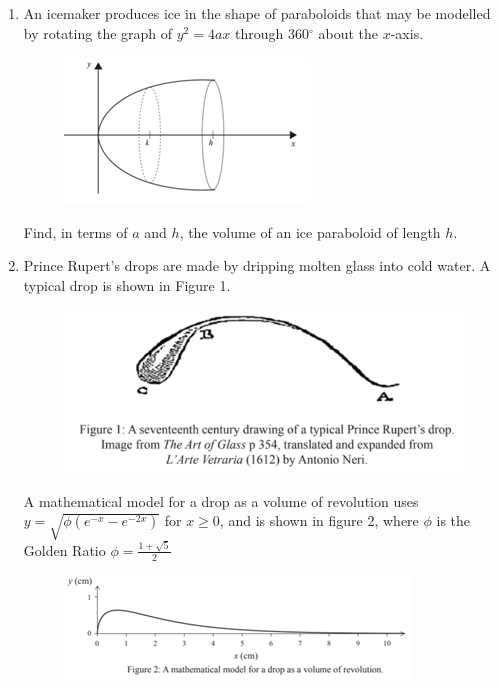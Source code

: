 \documentclass[../main.tex]{subfiles}
\begin{document}
\begin{enumerate}[itemsep=0.5cm]
    \pagebreak
    \item 
    An icemaker produces ice in the shape of paraboloids that may be modelled by rotating the graph of $y^2=4ax$ through 360$^{\circ}$ about the $x$-axis.

    \begin{figure}[h]
        \centering
        \includegraphics{images/volrev16.png}
    \end{figure}

    Find, in terms of $a$ and $h$, the volume of an ice paraboloid of length $h$.

    \item 
    Prince Rupert’s drops are made by dripping molten glass into cold water. A typical drop is shown in Figure 1.

    \begin{figure}[h]
        \centering
        \includegraphics{images/volrev17.png}
    \end{figure}

    A mathematical model for a drop as a volume of revolution uses $y=\sqrt{\phi(e^{-x}-e^{-2x})}$ for $x\geq 0$, and is shown in figure 2, where $\phi$ is the Golden Ratio $\phi=\frac{1+\sqrt{5}}{2}$

    \begin{figure}[h]
        \centering
        \includegraphics{images/volrev18.png}
    \end{figure}


\end{enumerate}
\end{document}

